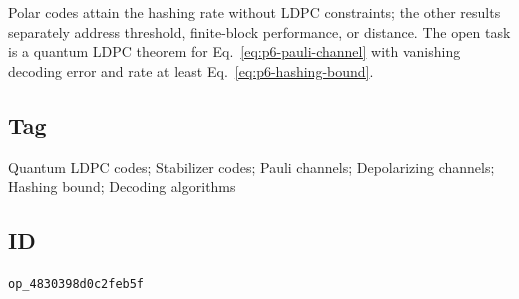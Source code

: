 Polar codes attain the hashing rate without LDPC constraints; the other
results separately address threshold, finite-block performance, or distance.
The open task is a quantum LDPC theorem for Eq.~\eqref{eq:p6-pauli-channel}
with vanishing decoding error and rate at least
Eq.~\eqref{eq:p6-hashing-bound}.

\subsection*{Tag}

Quantum LDPC codes; Stabilizer codes; Pauli channels; Depolarizing channels;
Hashing bound; Decoding algorithms

\subsection*{ID}

\texttt{op\_4830398d0c2feb5f}
